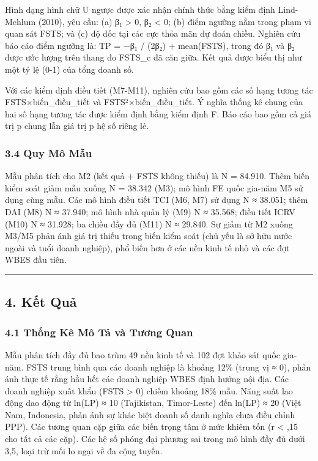 \documentclass[12pt,a4paper]{article}
\begin{document}
Hình dạng hình chữ U ngược được xác nhận chính thức bằng kiểm định
Lind-Mehlum (2010), yêu cầu: (a) β₁ \textgreater{} 0, β₂ \textless{} 0;
(b) điểm ngưỡng nằm trong phạm vi quan sát FSTS; và (c) độ dốc tại các
cực thỏa mãn dự đoán chiều. Nghiên cứu báo cáo điểm ngưỡng là: TP = −β₁
/ (2β₂) + mean(FSTS), trong đó β₁ và β₂ được ước lượng trên thang đo
FSTS\_c đã căn giữa. Kết quả được biểu thị như một tỷ lệ (0-1) của tổng
doanh số.

Với các kiểm định điều tiết (M7-M11), nghiên cứu bao gồm các số hạng
tương tác FSTS×biến\_điều\_tiết và FSTS²×biến\_điều\_tiết. Ý nghĩa thống
kê chung của hai số hạng tương tác được kiểm định bằng kiểm định F. Báo
cáo bao gồm cả giá trị p chung lẫn giá trị p hệ số riêng lẻ.

\hypertarget{34-quy-muxf4-mux1eabu}{%
\subsubsection{3.4 Quy Mô Mẫu}\label{34-quy-muxf4-mux1eabu}}

Mẫu phân tích cho M2 (kết quả + FSTS không thiếu) là N = 84.910. Thêm
biến kiểm soát giảm mẫu xuống N = 38.342 (M3); mô hình FE quốc gia-năm
M5 sử dụng cùng mẫu. Các mô hình điều tiết TCI (M6, M7) sử dụng N ≈
38.051; thêm DAI (M8) N ≈ 37.940; mô hình nhà quản lý (M9) N ≈ 35.568;
điều tiết ICRV (M10) N ≈ 31.928; ba chiều đầy đủ (M11) N ≈ 29.840. Sự
giảm từ M2 xuống M3/M5 phản ánh giá trị thiếu trong biến kiểm soát (chủ
yếu là sở hữu nước ngoài và tuổi doanh nghiệp), phổ biến hơn ở các nền
kinh tế nhỏ và các đợt WBES đầu tiên.

\begin{center}\rule{0.5\linewidth}{0.5pt}\end{center}

\hypertarget{4-kux1ebft-quux1ea3}{%
\subsection{4. Kết Quả}\label{4-kux1ebft-quux1ea3}}

\hypertarget{41-thux1ed1ng-kuxea-muxf4-tux1ea3-vuxe0-tux1b0ux1a1ng-quan}{%
\subsubsection{4.1 Thống Kê Mô Tả và Tương
Quan}\label{41-thux1ed1ng-kuxea-muxf4-tux1ea3-vuxe0-tux1b0ux1a1ng-quan}}

Mẫu phân tích đầy đủ bao trùm 49 nền kinh tế và 102 đợt khảo sát quốc
gia-năm. FSTS trung bình qua các doanh nghiệp là khoảng 12\% (trung vị ≈
0), phản ánh thực tế rằng hầu hết các doanh nghiệp WBES định hướng nội
địa. Các doanh nghiệp xuất khẩu (FSTS \textgreater{} 0) chiếm khoảng
18\% mẫu. Năng suất lao động dao động từ ln(LP) ≈ 10 (Tajikistan,
Timor-Leste) đến ln(LP) ≈ 20 (Việt Nam, Indonesia, phản ánh sự khác biệt
doanh số danh nghĩa chưa điều chỉnh PPP). Các tương quan cặp giữa các
biến trọng tâm ở mức khiêm tốn (\textbar r\textbar{} \textless{} ,15 cho
tất cả các cặp). Các hệ số phóng đại phương sai trong mô hình đầy đủ
dưới 3,5, loại trừ mối lo ngại về đa cộng tuyến.
\end{document}
